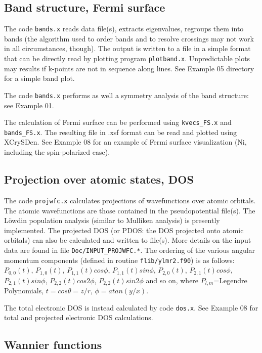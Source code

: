 \documentclass[12pt,a4paper]{article}
\begin{document}
\subsection{Band structure, Fermi surface}

The code \texttt{bands.x} reads data file(s), extracts eigenvalues,
regroups them into bands (the algorithm used to order bands and to resolve
crossings may not work in all circumstances, though). The output is written
to a file in a simple format that can be directly read by plotting program
\texttt{plotband.x}. Unpredictable plots may results if k-points are not in sequence
along lines. See Example 05 directory for a simple band plot.

The code \texttt{bands.x} performs as well a symmetry analysis of the band structure:
see Example 01. 

The calculation of Fermi surface can be performed using 
\texttt{kvecs\_FS.x} and
\texttt{bands\_FS.x}. The resulting file in .xsf format can be read and plotted
using XCrySDen. See Example 08 for an example of Fermi surface 
visualization (Ni, including the spin-polarized case).

\subsection{Projection over atomic states, DOS}

The code \texttt{projwfc.x} calculates projections of wavefunctions
over atomic orbitals. The atomic wavefunctions are those contained
in the pseudopotential file(s). The L\"owdin population analysis (similar to
Mulliken analysis) is presently implemented. The projected DOS (or PDOS:
the DOS projected onto atomic orbitals) can also be calculated and written
to file(s). More details on the input data are found in file
\texttt{Doc/INPUT\_PROJWFC.*}. The ordering of the various 
angular momentum components (defined in routine \texttt{flib/ylmr2.f90})
is as follows:
$P_{0,0}(t)$, $P_{1,0}(t)$, $P_{1,1}(t)cos\phi$, $P_{1,1}(t)sin\phi$,
 $P_{2,0}(t)$, $P_{2,1}(t)cos\phi$, $P_{2,1}(t)sin\phi$, 
 $P_{2,2}(t)cos2\phi$, $P_{2,2}(t)sin2\phi$
and so on, where $P_{l,m}$=Legendre Polynomials, 
$t = cos\theta = z/r$, $\phi= atan(y /x)$.

The total electronic DOS is instead calculated by code
\texttt{dos.x}. See Example 08 for total and projected 
electronic DOS calculations.

\subsection{Wannier functions}
\end{document}
